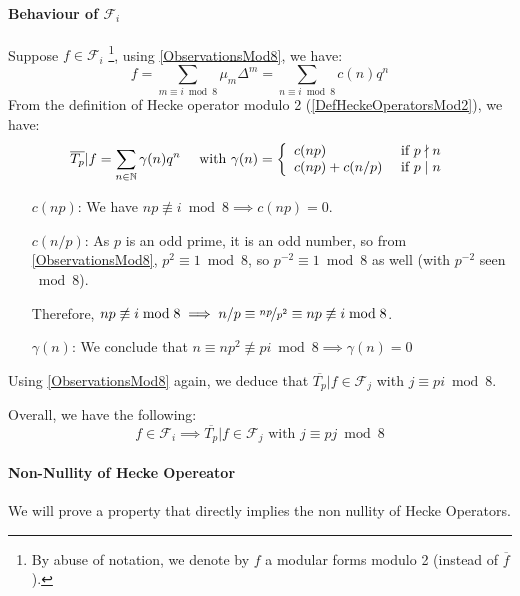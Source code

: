 \paragraph{Behaviour of $\mathcal{F}_i$}
\label{HeckeInF_i}
Suppose $f \in \mathcal{F}_i$ \footnote{By abuse of notation, we denote by $f$ a modular forms modulo 2 (instead of $\overline{f}$).}, using \ref{ObservationsMod8}, we have:
$$
f
= \sum_{m \equiv i \bmod 8} \mu_m\Delta^m 
= \sum_{n \equiv i \bmod 8} c(n)q^n
$$
From the definition of Hecke operator modulo 2 (\ref{DefHeckeOperatorsMod2}), we have:
$$
\overline{T_p}|f
= \sum_{n \in \mathbb{N}} \gamma(n)q^n
\quad \text{ with }
\gamma(n) = 
\left\lbrace 
\begin{array}{l l}
c(np)        & \text{ if } p \nmid n \\
c(np)+c(n/p) & \text{ if } p \mid  n
\end{array}
\right.
$$
\begin{enumerate}
	\item [$c(np)$:] We have $np \not \equiv i \bmod 8 \implies c(np) = 0$.
	\item [$c(n/p)$:] As $p$ is an odd prime, it is an odd number, so from \ref{ObservationsMod8}, $p^2 \equiv 1 \bmod 8$, so $p^{-2} \equiv 1 \bmod 8$ as well (with $p^{-2}$ seen $\bmod 8$).
	
	Therefore, $np \not\equiv i \bmod 8 \implies  n/p \equiv \nicefrac{np}{p^2} \equiv np \not\equiv i \bmod 8 $.
	
	\item [$\gamma(n)$:] We conclude that $n \equiv np^2 \not\equiv pi \bmod 8 \implies \gamma(n) = 0$
\end{enumerate}
Using \ref{ObservationsMod8} again, we deduce that $\overline{T_p}|f \in \mathcal{F}_j$ with $j \equiv pi \bmod 8$.

Overall, we have the following:
$$
f \in \mathcal{F}_i \implies \overline{T_p}|f \in \mathcal{F}_j
\text{ with } j \equiv pj \bmod 8
$$

\paragraph{Non-Nullity of Hecke Opereator}
\label{HeckeNonNull}
We will prove a property that directly implies the non nullity of Hecke Operators.

